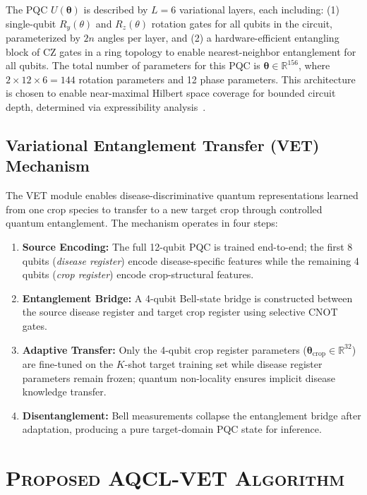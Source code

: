 \documentclass[conference]{IEEEtran}
\begin{document}
The PQC $U(\boldsymbol{\theta})$ is described by $L = 6$ variational layers, each including: (1) single-qubit $R_y(\theta)$ and $R_z(\theta)$ rotation gates for all qubits in the circuit, parameterized by $2n$ angles per layer, and (2) a hardware-efficient entangling block of CZ gates in a ring topology to enable nearest-neighbor entanglement for all qubits. The total number of parameters for this PQC is $\boldsymbol{\theta} \in \mathbb{R}^{156}$, where $2 \times 12 \times 6 = 144$ rotation parameters and 12 phase parameters. This architecture is chosen to enable near-maximal Hilbert space coverage for bounded circuit depth, determined via expressibility analysis~\cite{sim2019}.

\subsection{Variational Entanglement Transfer (VET) Mechanism}

The VET module enables disease-discriminative quantum representations learned from one crop species to transfer to a new target crop through controlled quantum entanglement. The mechanism operates in four steps:

\begin{enumerate}
  \item \textbf{Source Encoding:} The full 12-qubit PQC is trained end-to-end; the first 8 qubits (\textit{disease register}) encode disease-specific features while the remaining 4 qubits (\textit{crop register}) encode crop-structural features.
  \item \textbf{Entanglement Bridge:} A 4-qubit Bell-state bridge is constructed between the source disease register and target crop register using selective CNOT gates.
  \item \textbf{Adaptive Transfer:} Only the 4-qubit crop register parameters ($\boldsymbol{\theta}_\text{crop} \in \mathbb{R}^{32}$) are fine-tuned on the $K$-shot target training set while disease register parameters remain frozen; quantum non-locality ensures implicit disease knowledge transfer.
  \item \textbf{Disentanglement:} Bell measurements collapse the entanglement bridge after adaptation, producing a pure target-domain PQC state for inference.
\end{enumerate}

\section{\textsc{Proposed AQCL-VET Algorithm}}
\label{sec:algo}
\end{document}
